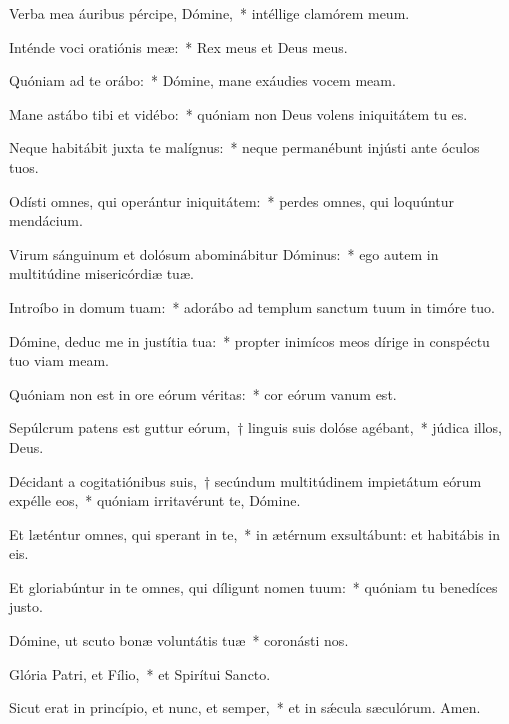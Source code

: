 \item Verba mea áuribus pércipe, Dómine,~* intéllige clamórem meum.

\item Inténde voci oratiónis meæ:~* Rex meus et Deus meus.

\item Quóniam ad te orábo:~* Dómine, mane exáudies vocem meam.

\item Mane astábo tibi et vidébo:~* quóniam non Deus volens iniquitátem tu es.

\item Neque habitábit juxta te malígnus:~* neque permanébunt injústi ante óculos tuos.

\item Odísti omnes, qui operántur iniquitátem:~* perdes omnes, qui loquúntur mendácium.

\item Virum sánguinum et dolósum abominábitur Dóminus:~* ego autem in multitúdine misericórdiæ tuæ.

\item Introíbo in domum tuam:~* adorábo ad templum sanctum tuum in timóre tuo.

\item Dómine, deduc me in justítia tua:~* propter inimícos meos dírige in conspéctu tuo viam meam.

\item Quóniam non est in ore eórum véritas:~* cor eórum vanum est.

\item Sepúlcrum patens est guttur eórum,~† linguis suis dolóse agébant,~* júdica illos, Deus.

\item Décidant a cogitatiónibus suis,~† secúndum multitúdinem impietátum eórum expélle eos,~* quóniam irritavérunt te, Dómine.

\item Et læténtur omnes, qui sperant in te,~* in ætérnum exsultábunt: et habitábis in eis.

\item Et gloriabúntur in te omnes, qui díligunt nomen tuum:~* quóniam tu benedíces justo.

\item Dómine, ut scuto bonæ voluntátis tuæ~* coronásti nos.

\item Glória Patri, et Fílio,~* et Spirítui Sancto.

\item Sicut erat in princípio, et nunc, et semper,~* et in sǽcula sæculórum. Amen.

